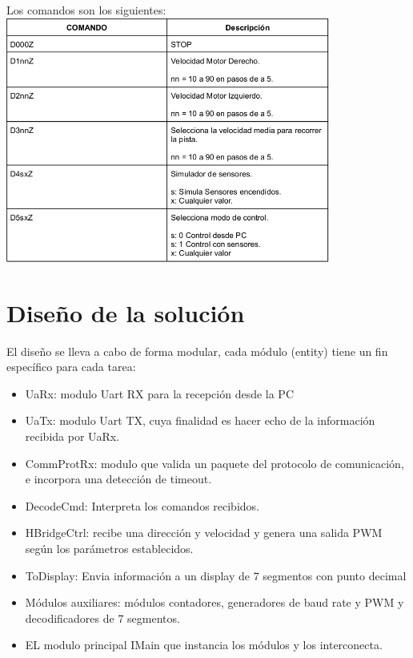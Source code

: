 \documentclass[12pt]{article}
\begin{document}
\newpage


Los comandos son los siguientes:
\\

    \includegraphics[width=0.8\textwidth]{det-protocolo}



\newpage

\section{Diseño de la solución}

El diseño se lleva a cabo de forma modular, cada módulo (entity) tiene un fin específico para cada tarea:
\begin{itemize}
\item UaRx: modulo Uart RX para la recepción desde la PC
\item UaTx: modulo Uart TX, cuya finalidad es hacer echo de la información recibida por UaRx.
\item CommProtRx: modulo que valida un paquete del protocolo de comunicación, e incorpora una detección de timeout.
\item DecodeCmd: Interpreta los comandos recibidos.
\item HBridgeCtrl: recibe una dirección y velocidad y genera una salida PWM según los parámetros establecidos.
\item ToDisplay: Envia información a un display de 7 segmentos con punto decimal
\item Módulos auxiliares: módulos contadores, generadores de baud rate y PWM y decodificadores de 7 segmentos.
\item EL modulo principal IMain que instancia los módulos y los interconecta.
\end{itemize}
\end{document}
